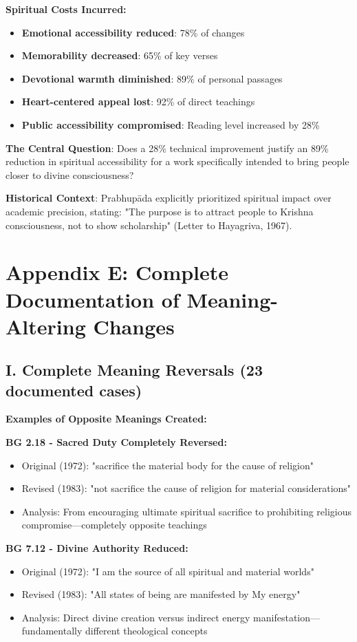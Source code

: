 \documentclass[11pt,twoside]{book}
\begin{document}
\textbf{\textbf{Spiritual Costs Incurred:}}
\begin{itemize}
\item \textbf{\textbf{Emotional accessibility reduced}}: 78\% of changes
\item \textbf{\textbf{Memorability decreased}}: 65\% of key verses
\item \textbf{\textbf{Devotional warmth diminished}}: 89\% of personal passages
\item \textbf{\textbf{Heart-centered appeal lost}}: 92\% of direct teachings
\item \textbf{\textbf{Public accessibility compromised}}: Reading level increased by 28\%
\end{itemize}

\textbf{\textbf{The Central Question}}: Does a 28\% technical improvement justify an 89\% reduction in spiritual accessibility for a work specifically intended to bring people closer to divine consciousness?

\textbf{\textbf{Historical Context}}: Prabhupāda explicitly prioritized spiritual impact over academic precision, stating: "The purpose is to attract people to Krishna consciousness, not to show scholarship" (Letter to Hayagriva, 1967).
\chapter*{Appendix E: Complete Documentation of Meaning-Altering Changes}
\label{sec:org96df23c}

\section*{I. Complete Meaning Reversals (23 documented cases)}
\label{sec:org03670c8}

\textbf{\textbf{Examples of Opposite Meanings Created:}}

\textbf{\textbf{BG 2.18 - Sacred Duty Completely Reversed:}}
\begin{itemize}
\item Original (1972): "sacrifice the material body for the cause of religion"
\item Revised (1983): "not sacrifice the cause of religion for material considerations"
\item Analysis: From encouraging ultimate spiritual sacrifice to prohibiting religious compromise—completely opposite teachings
\end{itemize}

\textbf{\textbf{BG 7.12 - Divine Authority Reduced:}}
\begin{itemize}
\item Original (1972): "I am the source of all spiritual and material worlds"
\item Revised (1983): "All states of being are manifested by My energy"
\item Analysis: Direct divine creation versus indirect energy manifestation—fundamentally different theological concepts
\end{itemize}
\end{document}
